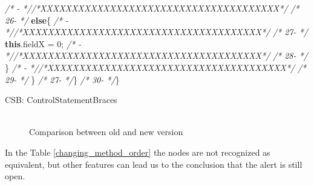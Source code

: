 \documentclass[
]{article}
\newenvironment{Shaded}{\begin{snugshade}}{\end{snugshade}}
\newcommand{\CommentTok}[1]{\textcolor[rgb]{0.56,0.35,0.01}{\textit{#1}}}
\newcommand{\DecValTok}[1]{\textcolor[rgb]{0.00,0.00,0.81}{#1}}
\newcommand{\FunctionTok}[1]{\textcolor[rgb]{0.00,0.00,0.00}{#1}}
\newcommand{\KeywordTok}[1]{\textcolor[rgb]{0.13,0.29,0.53}{\textbf{#1}}}
\newcommand{\NormalTok}[1]{#1}
\begin{document}
\begin{landscape}
\begin{Shaded}
\begin{Highlighting}[]
\CommentTok{/*   -   *//*XXXXXXXXXXXXXXXXXXXXXXXXXXXXXXXXXXXXXX*/}               \CommentTok{/* 26-   */}        \KeywordTok{else}\NormalTok{\{                                            }
\CommentTok{/*   -   *//*XXXXXXXXXXXXXXXXXXXXXXXXXXXXXXXXXXXXXX*/}               \CommentTok{/* 27-   */}            \KeywordTok{this}\NormalTok{.}\FunctionTok{fieldX}\NormalTok{ = }\DecValTok{0}\NormalTok{;                             }
\CommentTok{/*   -   *//*XXXXXXXXXXXXXXXXXXXXXXXXXXXXXXXXXXXXXX*/}               \CommentTok{/* 28-   */}\NormalTok{        \}                                                }
\CommentTok{/*   -   *//*XXXXXXXXXXXXXXXXXXXXXXXXXXXXXXXXXXXXXX*/}               \CommentTok{/* 29-   */}\NormalTok{    \}                                                    }
\CommentTok{/* 27-   */}\NormalTok{\}                                                        }\CommentTok{/* 30-   */}\NormalTok{\}                                                        }


\NormalTok{CSB: ControlStatementBraces}
\end{Highlighting}
\end{Shaded}

\normalsize

\begin{figure}
\centering
\includegraphics{figures/fake.png}
\caption{Comparison between old and new version
\label{comparison_changing_method_order}}
\end{figure}

\end{landscape}

\newpage

In the Table \ref{changing_method_order} the nodes are not recognized as
equivalent, but other features can lead us to the conclusion that the
alert is still open.

\small
\end{document}

